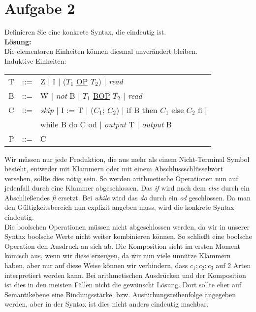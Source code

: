\documentclass[11pt,a4paper,ngerman]{article}
\begin{document}

\section*{Aufgabe 2}

Definieren Sie eine konkrete Syntax, die eindeutig ist. \\

\textbf{Lösung:}\\
Die elementaren Einheiten können diesmal unverändert bleiben.\\
Induktive Einheiten:\\
\begin{tabular}{rcl}
T &::=& Z | I | ($T_1$ \underline{OP} $T_2$) | \emph{read}\\
B &::=& W | \emph{not} B | $T_1$ \underline{BOP} $T_2$  | \emph{read}\\
C &::=& \emph{skip} | I := T | ($C_1$; $C_2$) | if B then $C_1$ else $C_2$ fi | \\
    &     &  while B do C od | \emph{output} T | \emph{output} B\\
P &::=& C
\end{tabular}

Wir müssen nur jede Produktion, die aus mehr als einem Nicht-Terminal Symbol besteht, entweder mit Klammern oder mit einem Abschlussschlüsselwort versehen, sollte dies nötig sein. So werden arithmetische Operationen nun auf jedenfall durch eine Klammer abgeschlossen. Das \emph{if} wird nach dem \emph{else} durch ein Abschließendes \emph{fi} ersetzt. Bei \emph{while} wird das \emph{do} durch ein \emph{od} geschlossen. Da man den Gültigkeitsbereich nun explizit angeben muss, wird die konkrete Syntax eindeutig.\\
Die boolschen Operationen müssen nicht abgeschlossen werden, da wir in unserer Syntax boolsche Werte nicht weiter kombinieren können. So schließt eine boolsche Operation den Ausdruck an sich ab. Die Komposition sieht im ersten Moment komisch aus, wenn wir diese erzeugen, da wir nun viele unnütze Klammern haben, aber nur auf diese Weise können wir verhindern, dass $c_1;c_2;c_3$ auf 2 Arten interpretiert werden kann.  Bei arithmetischen Ausdrücken und der Komposition ist dies in den meisten Fällen nicht die gewünscht Lösung. Dort sollte eher auf Semantikebene eine Bindungsstärke, bzw. Ausfürhungsreihenfolge angegeben werden, aber in der Syntax ist dies nicht anders eindeutig machbar.
\end{document}
